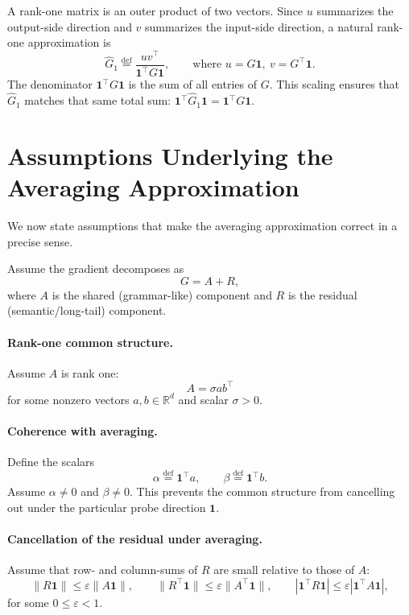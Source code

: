 \documentclass[11pt]{book}
\begin{document}
A rank-one matrix is an outer product of two vectors. Since $u$ summarizes the
output-side direction and $v$ summarizes the input-side direction, a natural
rank-one approximation is
\[
\widehat{G}_1 \stackrel{\mathrm{def}}{=} \frac{u v^\top}{\mathbf{1}^\top G \mathbf{1}},
\qquad \text{where } u=G\mathbf{1},\ v=G^\top\mathbf{1}.
\]
The denominator $\mathbf{1}^\top G \mathbf{1}$ is the sum of all entries of $G$.
This scaling ensures that $\widehat{G}_1$ matches that same total sum:
\(
\mathbf{1}^\top \widehat{G}_1 \mathbf{1} = \mathbf{1}^\top G \mathbf{1}.
\)

\section{Assumptions Underlying the Averaging Approximation}

We now state assumptions that make the averaging approximation correct in a precise sense.

Assume the gradient decomposes as
\[
G = A + R,
\]
where $A$ is the shared (grammar-like) component and $R$ is the residual
(semantic/long-tail) component.

\paragraph{Rank-one common structure.}
Assume $A$ is rank one:
\[
A = \sigma a b^\top
\]
for some nonzero vectors $a,b\in\mathbb{R}^d$ and scalar $\sigma>0$.

\paragraph{Coherence with averaging.}
Define the scalars
\[
\alpha \stackrel{\mathrm{def}}{=} \mathbf{1}^\top a,
\qquad
\beta \stackrel{\mathrm{def}}{=} \mathbf{1}^\top b.
\]
Assume $\alpha\neq 0$ and $\beta\neq 0$.
This prevents the common structure from cancelling out under the particular probe
direction $\mathbf{1}$.

\paragraph{Cancellation of the residual under averaging.}
Assume that row- and column-sums of $R$ are small relative to those of $A$:
\[
\|R\mathbf{1}\| \le \varepsilon \|A\mathbf{1}\|,
\qquad
\|R^\top\mathbf{1}\| \le \varepsilon \|A^\top\mathbf{1}\|,
\qquad
|\mathbf{1}^\top R\mathbf{1}| \le \varepsilon |\mathbf{1}^\top A\mathbf{1}|,
\]
for some $0\le \varepsilon<1$.
\end{document}

